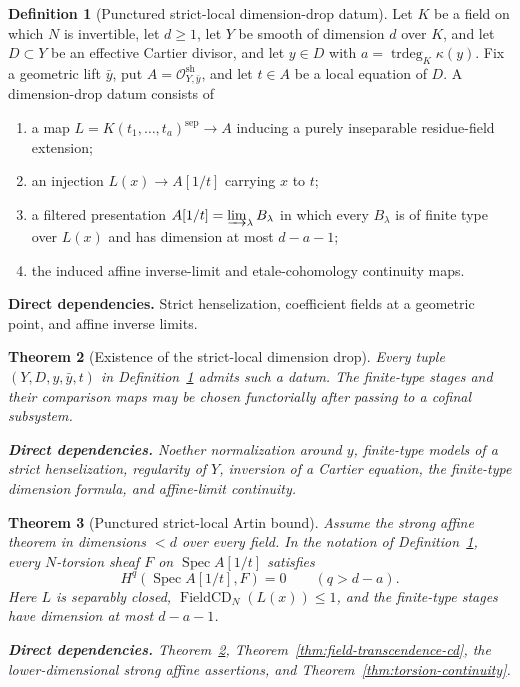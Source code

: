 \documentclass[10pt]{article}
\newtheorem{theorem}{Theorem}[section]
\theoremstyle{definition}
\newtheorem{definition}[theorem]{Definition}
\newcommand{\Spec}{\operatorname{Spec}}
\newcommand{\deps}[1]{\par\smallskip\noindent\textbf{Direct dependencies.} #1}
\begin{document}
\begin{definition}[Punctured strict-local dimension-drop datum]
\label{def:punctured-strict-local}
Let $K$ be a field on which $N$ is invertible, let $d\geq1$, let $Y$ be
smooth of dimension $d$ over $K$, and let $D\subset Y$ be an
effective Cartier divisor, and let $y\in D$ with
$a=\operatorname{trdeg}_K\kappa(y)$.  Fix a geometric lift $\bar y$, put
$A=\mathcal O^{\mathrm{sh}}_{Y,\bar y}$, and let $t\in A$ be a local equation
of $D$.  A dimension-drop datum consists of
\begin{enumerate}
\item a map $L=K(t_1,\ldots,t_a)^{\mathrm{sep}}\to A$ inducing a purely
      inseparable residue-field extension;
\item an injection $L(x)\to A[1/t]$ carrying $x$ to $t$;
\item a filtered presentation
      $A[1/t]=\varinjlim_\lambda B_\lambda$ in which every $B_\lambda$ is
      of finite type over $L(x)$ and has dimension at most $d-a-1$;
\item the induced affine inverse-limit and etale-cohomology continuity maps.
\end{enumerate}
\deps{Strict henselization, coefficient fields at a geometric point, and
affine inverse limits.}
\end{definition}

\begin{theorem}[Existence of the strict-local dimension drop]
\label{thm:punctured-strict-local-exists}
Every tuple $(Y,D,y,\bar y,t)$ in
Definition~\ref{def:punctured-strict-local} admits such a datum.  The
finite-type stages and their comparison maps may be chosen functorially after
passing to a cofinal subsystem.
\deps{Noether normalization around $y$, finite-type models of a strict
henselization, regularity of $Y$, inversion of a Cartier equation, the
finite-type dimension formula, and affine-limit continuity.}
\end{theorem}

\begin{theorem}[Punctured strict-local Artin bound]
\label{thm:punctured-strict-local-bound}
Assume the strong affine theorem in dimensions $<d$ over every field.  In the
notation of Definition~\ref{def:punctured-strict-local}, every $N$-torsion
sheaf $F$ on $\Spec A[1/t]$ satisfies
\[
 H^q(\Spec A[1/t],F)=0\qquad(q>d-a).
\]
Here $L$ is separably closed, $\operatorname{FieldCD}_N(L(x))\leq1$, and the
finite-type stages have dimension at most $d-a-1$.
\deps{Theorem~\ref{thm:punctured-strict-local-exists},
Theorem~\ref{thm:field-transcendence-cd}, the lower-dimensional strong affine
assertions, and Theorem~\ref{thm:torsion-continuity}.}
\end{theorem}
\end{document}
